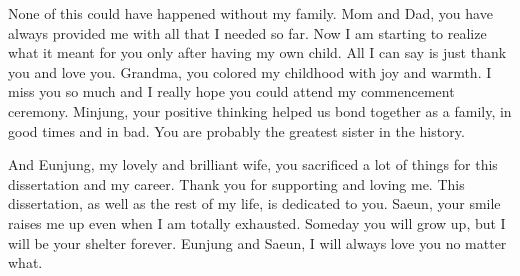 None of this could have happened without my family.  Mom and Dad, you have always provided me with
all that I needed so far.  Now I am starting to realize what it meant for you only after having my
own child.  All I can say is just thank you and love you.  Grandma, you colored my childhood with
joy and warmth.  I miss you so much and I really hope you could attend my commencement ceremony.
Minjung, your positive thinking helped us bond together as a family, in good times and in bad.  You
are probably the greatest sister in the history.

And Eunjung, my lovely and brilliant wife, you sacrificed a lot of things for this dissertation and
my career.  Thank you for supporting and loving me.  This dissertation, as well as the rest of my
life, is dedicated to you.  Saeun, your smile raises me up even when I am totally exhausted.
Someday you will grow up, but I will be your shelter forever.  Eunjung and Saeun, I will always love
you no matter what.



